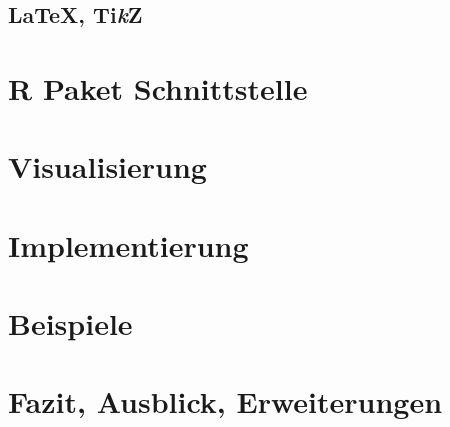 \documentclass[germanthesis]{thesis-style}
\begin{document}
\section{\LaTeX, Ti\textit{k}Z}

\chapter{R Paket Schnittstelle}
\label{chapter:interface}


\chapter{Visualisierung}

\chapter{Implementierung}

\chapter{Beispiele}

\chapter{Fazit, Ausblick, Erweiterungen}

\cleardoublepage%

\listofabbreviations
\clearpage

\listoffigures
\clearpage

\listoftables
\clearpage

\lstlistoflistings
\clearpage

\printbibliography
\end{document}
